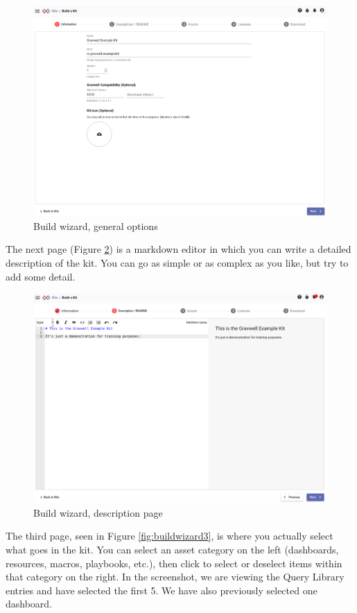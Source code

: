 \begin{figure}[H]
	\includegraphics[width=0.8\linewidth]{images/buildwizard1.png}
	\caption{Build wizard, general options}
	\label{fig:buildwizard1}
\end{figure}

The next page (Figure \ref{fig:buildwizard2}) is a markdown editor in which you can write a detailed description of the kit. You can go as simple or as complex as you like, but try to add some detail. 

\begin{figure}[H]
	\includegraphics[width=0.8\linewidth]{images/buildwizard2.png}
	\caption{Build wizard, description page}
	\label{fig:buildwizard2}
\end{figure}

The third page, seen in Figure \ref{fig:buildwizard3}, is where you actually select what goes in the kit. You can select an asset category on the left (dashboards, resources, macros, playbooks, etc.), then click to select or deselect items within that category on the right. In the screenshot, we are viewing the Query Library entries and have selected the first 5. We have also previously selected one dashboard.

